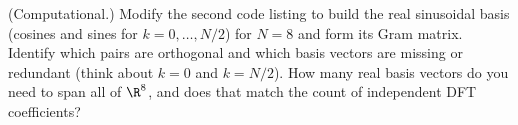 \begin{exercise}
(Computational.) Modify the second code listing to build the real sinusoidal basis (cosines and sines
for $k=0,\dots,N/2$) for $N=8$ and form its Gram matrix. Identify which pairs are orthogonal and
which basis vectors are missing or redundant (think about $k=0$ and $k=N/2$). How many real basis
vectors do you need to span all of $\R^8$, and does that match the count of independent DFT
coefficients?
\end{exercise}
